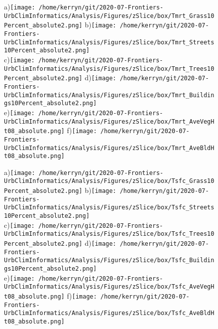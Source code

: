 \documentclass{article}
\begin{document}
\begin{figure} %
\centering    
{\tiny a)}\texttt{[image: /home/kerryn/git/2020-07-Frontiers-UrbClimInformatics/Analysis/Figures/zSlice/box/Tmrt\_Grass10Percent\_absolute2.png]}
{\tiny b)}\texttt{[image: /home/kerryn/git/2020-07-Frontiers-UrbClimInformatics/Analysis/Figures/zSlice/box/Tmrt\_Streets10Percent\_absolute2.png]}\\
{\tiny c)}\texttt{[image: /home/kerryn/git/2020-07-Frontiers-UrbClimInformatics/Analysis/Figures/zSlice/box/Tmrt\_Trees10Percent\_absolute2.png]}
{\tiny d)}\texttt{[image: /home/kerryn/git/2020-07-Frontiers-UrbClimInformatics/Analysis/Figures/zSlice/box/Tmrt\_Buildings10Percent\_absolute2.png]}\\
{\tiny e)}\texttt{[image: /home/kerryn/git/2020-07-Frontiers-UrbClimInformatics/Analysis/Figures/zSlice/box/Tmrt\_AveVegHt08\_absolute.png]}
{\tiny f)}\texttt{[image: /home/kerryn/git/2020-07-Frontiers-UrbClimInformatics/Analysis/Figures/zSlice/box/Tmrt\_AveBldHt08\_absolute.png]}
\end{figure} 
\clearpage

\begin{figure}%
\centering    
{\tiny a)}\texttt{[image: /home/kerryn/git/2020-07-Frontiers-UrbClimInformatics/Analysis/Figures/zSlice/box/Tsfc\_Grass10Percent\_absolute2.png]}
{\tiny b)}\texttt{[image: /home/kerryn/git/2020-07-Frontiers-UrbClimInformatics/Analysis/Figures/zSlice/box/Tsfc\_Streets10Percent\_absolute2.png]}\\
{\tiny c)}\texttt{[image: /home/kerryn/git/2020-07-Frontiers-UrbClimInformatics/Analysis/Figures/zSlice/box/Tsfc\_Trees10Percent\_absolute2.png]}
{\tiny d)}\texttt{[image: /home/kerryn/git/2020-07-Frontiers-UrbClimInformatics/Analysis/Figures/zSlice/box/Tsfc\_Buildings10Percent\_absolute2.png]}\\
{\tiny e)}\texttt{[image: /home/kerryn/git/2020-07-Frontiers-UrbClimInformatics/Analysis/Figures/zSlice/box/Tsfc\_AveVegHt08\_absolute.png]}
{\tiny f)}\texttt{[image: /home/kerryn/git/2020-07-Frontiers-UrbClimInformatics/Analysis/Figures/zSlice/box/Tsfc\_AveBldHt08\_absolute.png]}
\end{figure} 
\clearpage
\end{document}
